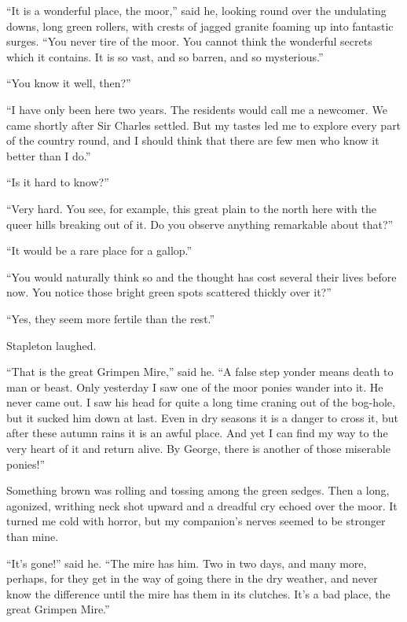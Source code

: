 \documentclass[paper=5.5in:8.5in,BCOR=7mm,twoside,DIV=calc,12pt,usegeometry,openany,chapterprefix,endperiod]{scrbook} %
\begin{document}
\enquote{It is a wonderful place, the moor,} said he, looking round over the undulating downs, long green rollers, with crests of jagged granite foaming up into fantastic surges. \enquote{You never tire of the moor. You cannot think the wonderful secrets which it contains. It is so vast, and so barren, and so mysterious.}

\enquote{You know it well, then?}

\enquote{I have only been here two years. The residents would call me a newcomer. We came shortly after Sir Charles settled. But my tastes led me to explore every part of the country round, and I should think that there are few men who know it better than I do.}

\enquote{Is it hard to know?}

\enquote{Very hard. You see, for example, this great plain to the north here with the queer hills breaking out of it. Do you observe anything remarkable about that?}

\enquote{It would be a rare place for a gallop.}

\enquote{You would naturally think so and the thought has cost several their lives before now. You notice those bright green spots scattered thickly over it?}

\enquote{Yes, they seem more fertile than the rest.}

Stapleton laughed.

\enquote{That is the great Grimpen Mire,} said he. \enquote{A false step yonder means death to man or beast. Only yesterday I saw one of the moor ponies wander into it. He never came out. I saw his head for quite a long time craning out of the bog-hole, but it sucked him down at last. Even in dry seasons it is a danger to cross it, but after these autumn rains it is an awful place. And yet I can find my way to the very heart of it and return alive. By George, there is another of those miserable ponies!}

Something brown was rolling and tossing among the green sedges. Then a long, agonized, writhing neck shot upward and a dreadful cry echoed over the moor. It turned me cold with horror, but my companion's nerves seemed to be stronger than mine.

\enquote{It's gone!} said he. \enquote{The mire has him. Two in two days, and many more, perhaps, for they get in the way of going there in the dry weather, and never know the difference until the mire has them in its clutches. It's a bad place, the great Grimpen Mire.}
\end{document}
